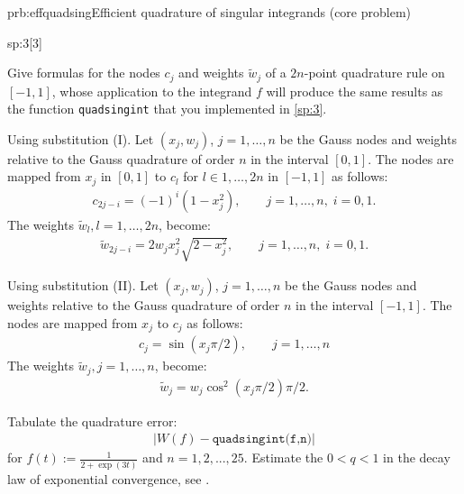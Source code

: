 \begin{samproblem}{prb:effquadsing}{Efficient quadrature of singular integrands (core problem)}
\begin{subproblem}{sp:3}[3]
\end{subproblem}

\iffalse

 \begin{subproblem}[2]
  Give formulas for the nodes $c_j$ and weights $\tilde{w}_j$ of a $2n$-point quadrature rule on $[-1,1]$, whose application to the integrand $f$ will produce the same results as the function \verb|quadsingint| that you implemented in \ref{sp:3}.
  
  \cprotEnv \begin{solution}
   Using substitution (I). Let $(x_j, w_j)$, $j=1,\dots,n$ be the Gauss nodes and weights relative to the Gauss quadrature of order $n$ in the interval $[0,1]$. The nodes are mapped from $x_j$ in $[0,1]$ to $c_l$ for $l \in 1,\dots,2n$ in $[-1,1]$ as follows:
    \begin{align*}
     c_{2j-i}  = (-1)^i (1-x_j^2),\qquad j=1,\dots,n,\;i=0,1.  
      \end{align*}
    The weights $\tilde{w}_{l}, l = 1,\dots,2n$, become:
    \begin{align*}
     \tilde{w}_{2j-i} = 2 w_j x_j^2 \sqrt{2 - x_j^2},\qquad j=1,\dots,n,\;i=0,1.
    \end{align*}
    
   Using substitution (II). Let $(x_j, w_j)$, $j=1,\dots,n$ be the Gauss nodes and weights relative to the Gauss quadrature of order $n$ in the interval $[-1,1]$.  The nodes are mapped from $x_j$ to $c_j$  as follows:
    \begin{align*}
     c_j = \sin(x_j  \pi / 2),\qquad j=1,\dots,n
    \end{align*}
    The weights $\tilde{w}_{j}, j = 1,\dots,n$, become:
    \begin{align*}
     \tilde{w}_{j} = w_j \cos^2(x_j  \pi / 2) \pi / 2.
    \end{align*}
  \end{solution}

 \end{subproblem}

%   
%     
 
 \begin{subproblem}[1]
  Tabulate the quadrature error:
   \begin{align*}
    \lvert W(f) - \texttt{quadsingint(f,n)} \rvert
   \end{align*}
   for $f(t) := \frac{1}{2+\exp(3t)}$ and $n = 1,2,...,25$. Estimate the $0 < q <
   1$ in the decay law of exponential convergence, see . 


\end{subproblem}
\end{samproblem}
